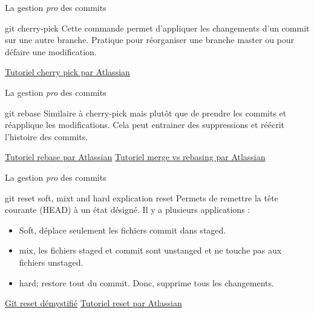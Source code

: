 \documentclass[11pt]{beamer}
\begin{document}
\begin{frame}[fragile]{La gestion \textit{pro} des commits}
	\begin{block}{git cherry-pick}
		Cette commande permet d'appliquer les changements d'un commit sur une autre branche. Pratique pour réorganiser une branche master ou pour défaire une modification. 
	\end{block}
	\href{https://www.atlassian.com/git/tutorials/cherry-pick}{Tutoriel cherry pick par Atlassian}
\end{frame}

\begin{frame}[fragile]{La gestion \textit{pro} des commits}
	\begin{block}{git rebase}
		Similaire à cherry-pick mais plutôt que de prendre les commits et réapplique les modifications. Cela peut entrainer des suppressions et réécrit l'histoire des commits.
	\end{block}
	\href{https://fr.atlassian.com/git/tutorials/rewriting-history/git-rebase}{Tutoriel rebase par Atlassian}\newline
	\href{https://www.atlassian.com/git/tutorials/merging-vs-rebasing}{Tutoriel merge vs rebasing par Atlassian}
\end{frame}

\begin{frame}{La gestion \textit{pro} des commits}
	\begin{block}{git reset soft, mixt and hard}
		explication reset
		Permets de remettre la tête courante (HEAD) à un état désigné. Il y a plusieurs applications :
		\begin{itemize}
			\item Soft, déplace seulement les fichiers commit dans staged.
			\item mix, les fichiers staged et commit sont unstanged et ne touche pas aux fichiers unstaged. 
			\item hard; restore tout du commit. Donc, supprime tous les changements.
		\end{itemize}
	\end{block}
	\href{https://git-scm.com/book/fr/v2/Utilitaires-Git-Reset-d\%C3\%A9mystifi\%C3\%A99}{Git reset démystifié}\newline
	\href{https://www.atlassian.com/git/tutorials/undoing-changes/git-reset}{Tutoriel reset par Atlassian}
\end{frame}
\end{document}
